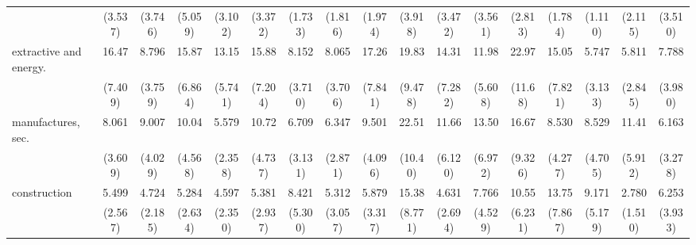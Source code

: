 {\begin{tabular}{l*{16}{c}}
                    &     (3.537)         &     (3.746)         &     (5.059)         &     (3.102)         &     (3.372)         &     (1.733)         &     (1.816)         &     (1.974)         &     (3.918)         &     (3.472)         &     (3.561)         &     (2.813)         &     (1.784)         &     (1.110)         &     (2.115)         &     (3.510)         \\
[1em]
extractive and energy.&       16.47\sym{***}&       8.796\sym{***}&       15.87\sym{***}&       13.15\sym{***}&       15.88\sym{***}&       8.152\sym{***}&       8.065\sym{***}&       17.26\sym{***}&       19.83\sym{***}&       14.31\sym{***}&       11.98\sym{***}&       22.97\sym{***}&       15.05\sym{***}&       5.747\sym{**} &       5.811\sym{***}&       7.788\sym{***}\\
                    &     (7.409)         &     (3.759)         &     (6.864)         &     (5.741)         &     (7.204)         &     (3.710)         &     (3.706)         &     (7.841)         &     (9.478)         &     (7.282)         &     (5.608)         &     (11.68)         &     (7.821)         &     (3.133)         &     (2.845)         &     (3.980)         \\
[1em]
manufactures, sec.  &       8.061\sym{***}&       9.007\sym{***}&       10.04\sym{***}&       5.579\sym{***}&       10.72\sym{***}&       6.709\sym{***}&       6.347\sym{***}&       9.501\sym{***}&       22.51\sym{***}&       11.66\sym{***}&       13.50\sym{***}&       16.67\sym{***}&       8.530\sym{***}&       8.529\sym{***}&       11.41\sym{***}&       6.163\sym{***}\\
                    &     (3.609)         &     (4.029)         &     (4.568)         &     (2.358)         &     (4.737)         &     (3.131)         &     (2.871)         &     (4.096)         &     (10.40)         &     (6.120)         &     (6.972)         &     (9.326)         &     (4.277)         &     (4.705)         &     (5.912)         &     (3.278)         \\
[1em]
construction        &       5.499\sym{***}&       4.724\sym{***}&       5.284\sym{***}&       4.597\sym{**} &       5.381\sym{**} &       8.421\sym{***}&       5.312\sym{**} &       5.879\sym{**} &       15.38\sym{***}&       4.631\sym{**} &       7.766\sym{***}&       10.55\sym{***}&       13.75\sym{***}&       9.171\sym{***}&       2.780         &       6.253\sym{**} \\
                    &     (2.567)         &     (2.185)         &     (2.634)         &     (2.350)         &     (2.937)         &     (5.300)         &     (3.057)         &     (3.317)         &     (8.771)         &     (2.694)         &     (4.529)         &     (6.231)         &     (7.867)         &     (5.179)         &     (1.510)         &     (3.933)         \\

\end{tabular}}
